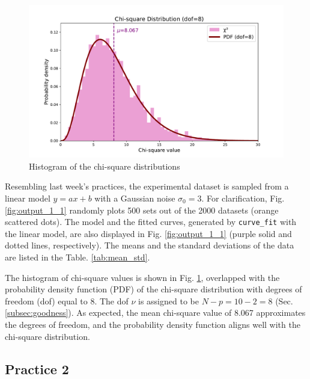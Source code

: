 \documentclass[12pt,a4paper]{article}
\newcommand{\hynote}[1]{{\bf\footnotesize \color{red}[YPH: #1]}}
\begin{document}
\begin{CJK}{UTF8}{bkai}
 
\begin{figure}[h]
    \centering
    \includegraphics[width=.8\linewidth]{figures/output/practice_1/output1_2.pdf}
    \caption{Histogram of the chi-square distributions}
    \label{fig:output_1_2}
\end{figure}

Resembling last week's practices, the experimental dataset is sampled from a linear model $y=ax+b$ with a Gaussian noise $\sigma_0 = 3$. For clarification, Fig. \ref{fig:output_1_1} randomly plots 500 sets out of the 2000 datasets (orange scattered dots). The model and the fitted curves, generated by \texttt{curve\_fit} with the linear model, are also displayed in Fig. \ref{fig:output_1_1} (purple solid and dotted lines, respectively). The means and the standard deviations of the data are listed in the Table. \ref{tab:mean_std}. 

The histogram of chi-square values is shown in Fig. \ref{fig:output_1_2}, overlapped with the probability density function (PDF) of the chi-square distribution with degrees of freedom (dof) equal to 8. The dof $\nu$ is assigned to be $ N-p = 10-2=8$ (Sec. \ref{subsec:goodness}). As expected, the mean chi-square value of 8.067 approximates the degrees of freedom, and the probability density function aligns well with the chi-square distribution.

\subsection{Practice 2}
\hfill



\end{CJK}
\end{document}

